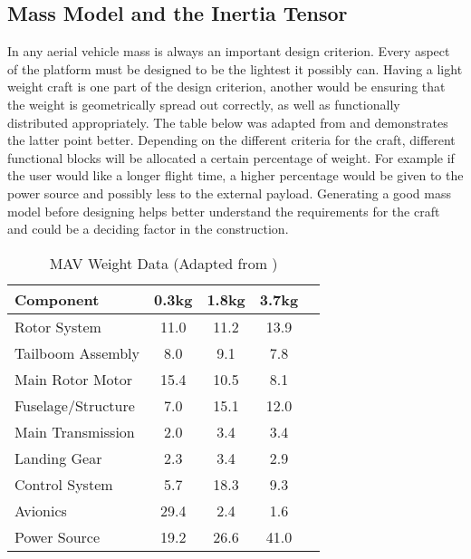 	\subsection{Mass Model and the Inertia Tensor}
	In any aerial vehicle mass is always an important design criterion. Every aspect of the platform must be designed to be the lightest it possibly can. Having a light weight craft is one part of the design criterion, another would be ensuring that the weight is geometrically spread out correctly, as well as functionally distributed appropriately. The table below was adapted from \cite{NewMAV} and demonstrates the latter point better. Depending on the different criteria for the craft, different functional blocks will be allocated a certain percentage of weight. For example if the user would like a longer flight time, a higher percentage would be given to the power source and possibly less to the external payload. Generating a good mass model before designing helps better understand the requirements for the craft and could be a deciding factor in the construction.
	
	\begin{table}[H]
		\centering
		\begin{tabular}{l | c | c | c | c}
			
			Component 					& 0.3kg & 1.8kg & 3.7kg\\
			\hline\hline
			Rotor System 				& 11.0 & 11.2 & 13.9\\
			Tailboom Assembly 			& 8.0 & 9.1 & 7.8\\
			Main Rotor Motor 			& 15.4 & 10.5 & 8.1\\
			Fuselage/Structure 			& 7.0 &  15.1 & 12.0\\
			Main Transmission 			& 2.0 &  3.4 & 3.4\\
			Landing Gear 				& 2.3 &  3.4 & 2.9\\
			Control System 				& 5.7 & 18.3 & 9.3\\
			Avionics 						& 29.4 &  2.4 & 1.6\\
			Power Source 				& 19.2 & 26.6 & 41.0\\
			
		\end{tabular}
		\caption{MAV Weight Data (Adapted from \cite{NewMAV})}
	\end{table}
	
